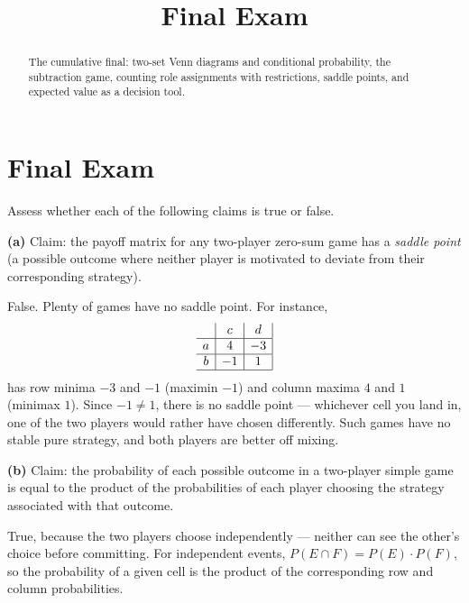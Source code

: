 \documentclass[12pt]{ximera}
\title{Final Exam}
\begin{document}
\begin{abstract}
The cumulative final: two-set Venn diagrams and conditional probability, the
subtraction game, counting role assignments with restrictions, saddle points, and
expected value as a decision tool.
\end{abstract}
\maketitle

\section*{Final Exam}

\begin{problem}
Assess whether each of the following claims is true or false.

\begin{prompt}
\textbf{(a)} Claim: the payoff matrix for any two-player zero-sum game has a
\emph{saddle point} (a possible outcome where neither player is motivated to deviate
from their corresponding strategy).

\begin{multipleChoice}
\end{multipleChoice}

\begin{feedback}
False. Plenty of games have no saddle point. For instance,
\[
\begin{array}{c|c|c|}
\phantom{|} & c & d \\\hline
a & 4 & -3 \\\hline
b & -1 & 1 \\\hline
\end{array}
\]
has row minima $-3$ and $-1$ (maximin $-1$) and column maxima $4$ and $1$
(minimax $1$). Since $-1\neq 1$, there is no saddle point --- whichever cell you
land in, one of the two players would rather have chosen differently. Such games have
no stable pure strategy, and both players are better off mixing.
\end{feedback}
\end{prompt}

\begin{prompt}
\textbf{(b)} Claim: the probability of each possible outcome in a two-player simple
game is equal to the product of the probabilities of each player choosing the
strategy associated with that outcome.

\begin{multipleChoice}
\end{multipleChoice}

\begin{feedback}
True, because the two players choose independently --- neither can see the other's
choice before committing. For independent events,
$P(E\cap F)=P(E)\cdot P(F)$, so the probability of a given cell is the product of the
corresponding row and column probabilities.
\end{feedback}
\end{prompt}
\end{problem}
\end{document}
